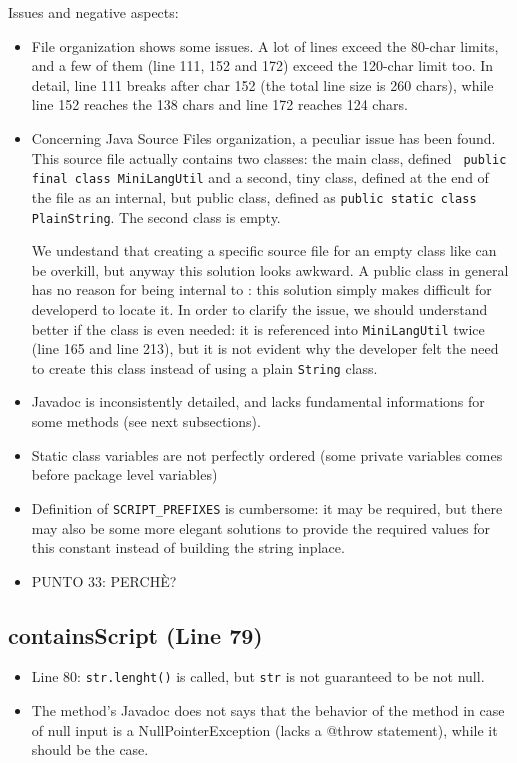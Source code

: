 \documentclass[11pt]{article} %
\begin{document}
Issues and negative aspects:
\begin{itemize}
	\item File organization shows some issues. A lot of lines exceed the 80-char limits, and a few of them (line 111, 152 and 172) exceed the 120-char limit too. In detail, line 111 breaks after char 152 (the total line size is 260 chars), while line 152 reaches the 138 chars and line 172 reaches 124 chars.

	\item Concerning Java Source Files organization, a peculiar issue has been found. This source file actually contains two classes: the main class, defined \texttt{ public final class MiniLangUtil} and a second, tiny class, defined at the end of the file as an internal, but public class, defined as \texttt{public static class PlainString}.
The second class is empty.

We undestand that creating a specific source file for an empty class like 
 can be overkill, but anyway this solution looks awkward. A public class in general has no reason for being internal to : this solution simply makes difficult for developerd to locate it. In order to clarify the issue, we should understand better if the class is even needed: it is referenced into \texttt{MiniLangUtil} twice (line 165 and line 213), but it is not evident why the developer felt the need to create this class instead of using a plain \texttt{String} class.

	\item Javadoc is inconsistently detailed, and lacks fundamental informations for some methods (see next subsections).

	\item Static class variables are not perfectly ordered (some private variables comes before package level variables)

	\item Definition of \texttt{SCRIPT\_PREFIXES} is cumbersome: it may be required, but there may also be some more elegant solutions to provide the required values for this constant instead of building the string inplace.

	\item PUNTO 33: PERCHÈ?

\end{itemize}

\subsection{containsScript (Line 79)}
\begin{itemize}
	\item Line 80: \texttt{str.lenght()} is called, but \texttt{str} is not guaranteed to be not null. 
	\item The method's Javadoc does not says that the behavior of the method in case of null input is a NullPointerException (lacks a @throw statement), while it should be the case.
\end{itemize}
\end{document}
